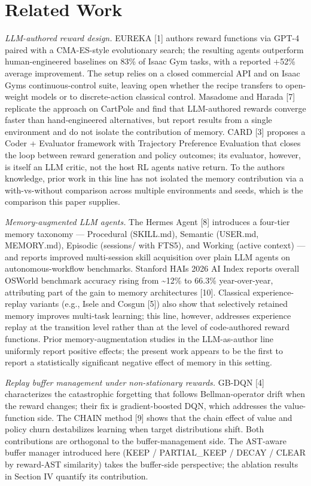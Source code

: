 \documentclass[conference,letterpaper,10pt]{IEEEtran}
\begin{document}
\section{Related Work}

\emph{LLM-authored reward design.} EUREKA {[}1{]} authors reward functions via GPT-4 paired with a CMA-ES-style evolutionary search; the resulting agents outperform human-engineered baselines on 83\% of Isaac Gym tasks, with a reported +52\% average improvement. The setup relies on a closed commercial API and on Isaac Gym\textquotesingle s continuous-control suite, leaving open whether the recipe transfers to open-weight models or to discrete-action classical control. Masadome and Harada {[}7{]} replicate the approach on CartPole and find that LLM-authored rewards converge faster than hand-engineered alternatives, but report results from a single environment and do not isolate the contribution of memory. CARD {[}3{]} proposes a Coder + Evaluator framework with Trajectory Preference Evaluation that closes the loop between reward generation and policy outcomes; its evaluator, however, is itself an LLM critic, not the host RL agent\textquotesingle s native return. To the authors\textquotesingle{} knowledge, prior work in this line has not isolated the memory contribution via a with-vs-without comparison across multiple environments and seeds, which is the comparison this paper supplies.

\emph{Memory-augmented LLM agents.} The Hermes Agent {[}8{]} introduces a four-tier memory taxonomy --- Procedural (SKILL.md), Semantic (USER.md, MEMORY.md), Episodic (sessions/ with FTS5), and Working (active context) --- and reports improved multi-session skill acquisition over plain LLM agents on autonomous-workflow benchmarks. Stanford HAI\textquotesingle s 2026 AI Index reports overall OSWorld benchmark accuracy rising from \textasciitilde12\% to 66.3\% year-over-year, attributing part of the gain to memory architectures {[}10{]}. Classical experience-replay variants (e.g., Isele and Cosgun {[}5{]}) also show that selectively retained memory improves multi-task learning; this line, however, addresses experience replay at the transition level rather than at the level of code-authored reward functions. Prior memory-augmentation studies in the LLM-as-author line uniformly report positive effects; the present work appears to be the first to report a statistically significant negative effect of memory in this setting.

\emph{Replay buffer management under non-stationary rewards.} GB-DQN {[}4{]} characterizes the catastrophic forgetting that follows Bellman-operator drift when the reward changes; their fix is gradient-boosted DQN, which addresses the value-function side. The CHAIN method {[}9{]} shows that the chain effect of value and policy churn destabilizes learning when target distributions shift. Both contributions are orthogonal to the buffer-management side. The AST-aware buffer manager introduced here (KEEP / PARTIAL\_KEEP / DECAY / CLEAR by reward-AST similarity) takes the buffer-side perspective; the ablation results in Section IV quantify its contribution.
\end{document}
